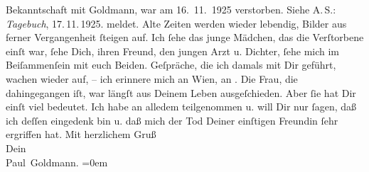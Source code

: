 \begin{ledgroupsized}[t]{13cm}
{{{                  Bekanntschaft mit Goldmann, war am 16. 11. 1925 verstorben. Siehe A. S.: \emph{Tagebuch}, 17. 11. 1925.}}}\label{K_L03480-2h} meldet.
               Alte Zeiten werden wieder lebendig, Bilder aus ferner Vergangenheit ſteigen auf. Ich
               ſehe das junge Mädchen, das die Verſtorbene einſt war, ſehe Dich, ihren Freund, den jungen Arzt u. Dichter,
               ſehe mich im Beiſammenſein mit euch Beiden. Geſpräche, die ich damals mit Dir geführt, wachen
               wieder auf, – ich erinnere mich an Wien, an
                  \label{K_L03480-3v}\label{K_L03480-3h}.\pend
           \pstart
           Die Frau, die dahingegangen
               iſt, war längſt aus Deinem Leben ausgeſchieden. Aber ſie hat Dir einſt viel bedeutet.
                   Ich habe an alledem {\pb}teilgenommen u. will Dir nur ſagen, daß ich
               deſſen eingedenk bin u. daß mich der Tod Deiner einſtigen Freundin ſehr ergriffen hat.\pend
           \pstart
           Mit herzlichem Gruß {\\[\baselineskip]}Dein {\\[\baselineskip]}\spacefill\mbox{Paul Goldmann.}\pend
           \leftskip=0em{}
         
         \endnumbering{}\end{ledgroupsized}  \newcommand{\dateiname}{L03480}\newcommand{\titel}{Paul Goldmann an Arthur Schnitzler, 20. 11. 1925}\newcommand{\editorInnen}{Martin Anton Müller und Laura Untner}
      